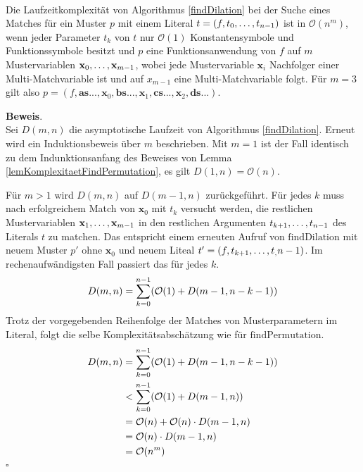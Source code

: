 \begin{lemma}\label{lemKomplexitaetDilation}~\\
Die Laufzeitkomplexität von Algorithmus \ref{findDilation} bei der Suche eines Matches für ein Muster $p$  mit einem Literal $t = (f, {t}_{0}, \dots, {t}_{n-1})$ ist in $\mathcal O(n^m)$, wenn jeder Parameter $t_k$ von $t$ nur $\mathcal O(1)$ Konstantensymbole und Funktionssymbole besitzt und $p$ eine Funktionsanwendung von $f$ auf $m$ Mustervariablen ${\mathbf x}_{0}, \dots, {\mathbf x}_{m-1}$, 
wobei jede Mustervariable $\mathbf x_i$ Nachfolger einer Multi-Matchvariable ist und auf $x_{m-1}$ eine Multi-Matchvariable folgt. Für $m = 3$ gilt also $p = (f, \mathbf{as...}, \mathbf x_0, \mathbf{bs...}, \mathbf x_1, \mathbf{cs...}, \mathbf x_2, \mathbf{ds...})$.
\end{lemma}

\textbf{Beweis}.\\
Sei $D(m, n)$ die asymptotische Laufzeit von Algorithmus \ref{findDilation}. Erneut wird ein Induktionsbeweis über $m$ beschrieben.
Mit $m = 1$ ist der Fall identisch zu dem Indunktionsanfang des Beweises von Lemma \ref{lemKomplexitaetFindPermutation}, es gilt $D(1, n) = \mathcal O(n)$. 

Für $m > 1$ wird $D(m, n)$ auf $D(m-1, n)$ zurückgeführt. Für jedes $k$ muss nach erfolgreichem Match von $\mathbf x_0$ mit $t_k$ versucht werden, die restlichen Mustervariablen ${\mathbf x}_{1}, \dots, {\mathbf x}_{m-1}$ in den restlichen Argumenten ${t}_{k+1}, \dots, {t}_{n-1}$ des Literals $t$ zu matchen. Das entspricht einem erneuten Aufruf von $\mathrm{findDilation}$ mit neuem Muster $p'$ ohne $\mathbf x_0$ und neuem Liteal $t' = (f, {t}_{k+1}, \dots, {t}_{,} {n-1})$.
Im rechenaufwändigsten Fall passiert das für jedes $k$.
$$D(m, n) = \sum_{k = 0}^{n-1} \paren*{\mathcal O(1) + D(m-1, n - k - 1)}$$
Trotz der vorgegebenden Reihenfolge der Matches von Musterparametern im Literal, folgt die selbe Komplexitätsabschätzung wie für $\mathrm{findPermutation}$.
\begin{equation*}
	\begin{split} 
		D(m, n) 
		&= \sum_{k = 0}^{n-1} \paren*{\mathcal O(1) + D(m-1, n - k - 1)}\\ 
		&< \sum_{k = 0}^{n-1} \paren*{\mathcal O(1) + D(m-1, n)}\\
		&= \mathcal O(n) + \mathcal O(n) \cdot D(m-1, n)\\
		&= \mathcal O(n) \cdot D(m-1, n)\\
		&= \mathcal O(n^m)
	\end{split}
\end{equation*}
\hfill $\square$\\


